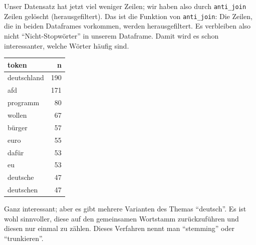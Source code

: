\documentclass[12pt,ngerman,]{book}
\makeatletter
\newenvironment{Shaded}{\begin{snugshade}}{\end{snugshade}}
\newcommand{\KeywordTok}[1]{\textcolor[rgb]{0.13,0.29,0.53}{\textbf{{#1}}}}
\newcommand{\DataTypeTok}[1]{\textcolor[rgb]{0.13,0.29,0.53}{{#1}}}
\newcommand{\StringTok}[1]{\textcolor[rgb]{0.31,0.60,0.02}{{#1}}}
\newcommand{\OtherTok}[1]{\textcolor[rgb]{0.56,0.35,0.01}{{#1}}}
\newcommand{\NormalTok}[1]{{#1}}
\newenvironment{kframe}{%
\medskip{}
\setlength{\fboxsep}{.8em}
 \def\at@end@of@kframe{}%
 \ifinner\ifhmode%
  \def\at@end@of@kframe{\end{minipage}}%
  \begin{minipage}{\columnwidth}%
 \fi\fi%
 \def\FrameCommand##1{\hskip\@totalleftmargin \hskip-\fboxsep
 \colorbox{shadecolor}{##1}\hskip-\fboxsep
     \hskip-\linewidth \hskip-\@totalleftmargin \hskip\columnwidth}%
 \MakeFramed {\advance\hsize-\width
   \@totalleftmargin\z@ \linewidth\hsize
   \@setminipage}}%
 {\par\unskip\endMakeFramed%
 \at@end@of@kframe}
\renewenvironment{Shaded}{\begin{kframe}}{\end{kframe}}
\makeatother
\begin{document}
\begin{Shaded}
\end{Shaded}

Unser Datensatz hat jetzt viel weniger Zeilen; wir haben also durch
\texttt{anti\_join} Zeilen gelöscht (herausgefiltert). Das ist die
Funktion von \texttt{anti\_join}: Die Zeilen, die in beiden Dataframes
vorkommen, werden herausgefiltert. Es verbleiben also nicht
``Nicht-Stopwörter'' in unserem Dataframe. Damit wird es schon
interessanter, welche Wörter häufig sind.

\begin{Shaded}
\end{Shaded}

\begin{tabular}{l|r}
\hline
token & n\\
\hline
deutschland & 190\\
\hline
afd & 171\\
\hline
programm & 80\\
\hline
wollen & 67\\
\hline
bürger & 57\\
\hline
euro & 55\\
\hline
dafür & 53\\
\hline
eu & 53\\
\hline
deutsche & 47\\
\hline
deutschen & 47\\
\hline
\end{tabular}

Ganz interessant; aber es gibt mehrere Varianten des Themas ``deutsch''.
Es ist wohl sinnvoller, diese auf den gemeinsamen Wortstamm
zurückzuführen und diesen nur einmal zu zählen. Dieses Verfahren nennt
man ``stemming'' oder ``trunkieren''.
\end{document}
